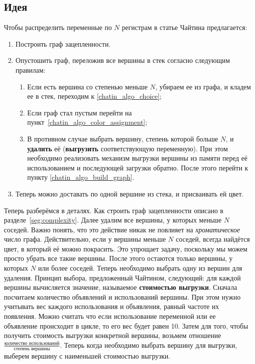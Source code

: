 \subsection{Идея}

Чтобы распределить переменные по $N$ регистрам в статье Чайтина предлагается:

\begin{enumerate}
    \item Построить граф зацепленности.\label{chatin_algo_build_graph}
    \item Опустошить граф, переложив все вершины в стек согласно следующим правилам: \label{chatin_algo_choice}\begin{enumerate}
        \item Если есть вершина со степенью меньше $N$, убираем ее из графа, и кладем ее в стек, переходим
        к \ref{chatin_algo_choice};
        \item Если граф стал пустым перейти на пункт~\ref{chatin_algo_color_assignment};
        \item В противном случае выбрать вершину, степень которой больше $N$, и \textbf{удалить} её (\textbf{выгрузить} соответствующую переменную).
        При этом необходимо реализовать механизм выгрузки вершины из памяти перед её использованием и
        последующей загрузки обратно. После этого перейти к пункту \ref{chatin_algo_build_graph}.
        \label{chatin_algo_spill}
    \end{enumerate}

    \item Теперь можно доставать по одной вершине из стека, и присваивать ей цвет. \label{chatin_algo_color_assignment}
\end{enumerate}

Теперь разберёмся в деталях. Как строить граф зацепленности описано в разделе~\ref{seg:complexity}. Далее удалим все вершины, у
которых меньше $N$ соседей. Важно понять, что это действие никак не повлияет на \textit{хроматическое} число графа. Действительно,
если у вершины меньше $N$ соседей, всегда найдётся цвет, в который её можно покрасить.
 Это упрощает задачу, поскольку мы можем просто убрать все такие вершины.
После этого остаются только вершины, у которых $N$ или более соседей. Теперь необходимо выбрать одну из вершин для удаления. Принцип выбора,
предложенный Чайтином, следующий: для каждой вершины вычисляется значение, называемое \textbf{стоимостью выгрузки}. Сначала посчитаем количество
объявлений и использований вершины. При этом нужно учитывать вес каждого использования и объявления, равный частоте их появления.
Можно считать что если использование переменной или ее объявление происходит в цикле, то его вес будет равен 10.
Затем для того, чтобы получить стоимость выгрузки конкретной вершины, возьмем отношение
$\frac{\textit{количество использований}}{\textit{степень вершины}}$. Теперь когда необходимо выбрать вершину для выгрузки,
выберем вершину с наименьшей стоимостью выгрузки.


